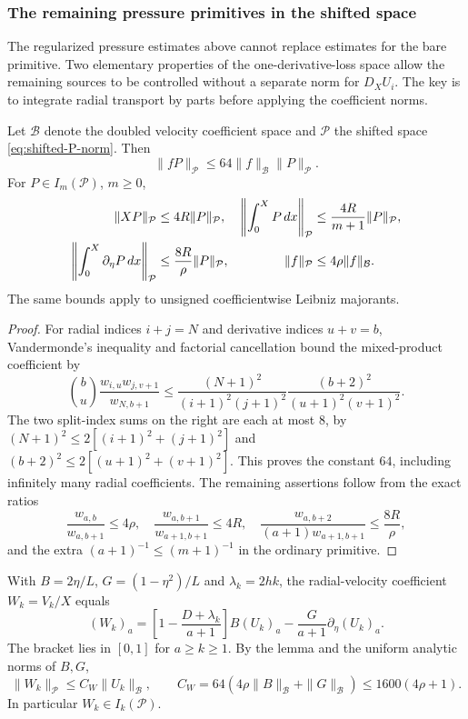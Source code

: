 \subsubsection*{The remaining pressure primitives in the shifted space}
\label{subsec:remaining-bare-pressure}
The regularized pressure estimates above cannot replace estimates for the
bare primitive. Two elementary properties of the one-derivative-loss space
allow the remaining sources to be controlled without a separate norm for
$D_XU_i$. The key is to integrate radial transport by parts before
applying the coefficient norms.

\begin{lemma}
\label{lem:BP-multiplier}
Let $\mathcal B$ denote the doubled velocity coefficient space and
$\mathcal P$ the shifted space \eqref{eq:shifted-P-norm}. Then
\begin{equation}\label{eq:BP-algebra}
 \|fP\|_{\mathcal P}\le64\|f\|_{\mathcal B}\|P\|_{\mathcal P}.
\end{equation}
For $P\in I_m(\mathcal P)$, $m\ge0$,
\begin{align}
 \|XP\|_{\mathcal P}&\le4R\|P\|_{\mathcal P},&
 \left\|\int_0^X P\,dx\right\|_{\mathcal P}
   &\le\frac{4R}{m+1}\|P\|_{\mathcal P},\label{eq:P-radial-ops}\\
 \left\|\int_0^X\partial_\eta P\,dx\right\|_{\mathcal P}
   &\le\frac{8R}{\rho}\|P\|_{\mathcal P},&
 \|f\|_{\mathcal P}&\le4\rho\|f\|_{\mathcal B}.\notag
\end{align}
The same bounds apply to unsigned coefficientwise Leibniz majorants.
\end{lemma}
\begin{proof}
For radial indices $i+j=N$ and derivative indices $u+v=b$,
Vandermonde's inequality and factorial cancellation bound the
mixed-product coefficient by
\[
 \binom bu\frac{w_{i,u}w_{j,v+1}}{w_{N,b+1}}
 \le\frac{(N+1)^2}{(i+1)^2(j+1)^2}
      \frac{(b+2)^2}{(u+1)^2(v+1)^2}.
\]
The two split-index sums on the right are each at most $8$, by
$(N+1)^2\le2[(i+1)^2+(j+1)^2]$ and
$(b+2)^2\le2[(u+1)^2+(v+1)^2]$. This proves the constant $64$,
including infinitely many radial coefficients.
The remaining assertions follow from the exact ratios
\[
 \frac{w_{a,b}}{w_{a,b+1}}\le4\rho,\quad
 \frac{w_{a,b+1}}{w_{a+1,b+1}}\le4R,\quad
 \frac{w_{a,b+2}}{(a+1)w_{a+1,b+1}}\le\frac{8R}{\rho},
\]
and the extra $(a+1)^{-1}\le(m+1)^{-1}$ in the ordinary primitive.
\end{proof}

With $B=2\eta/L$, $G=(1-\eta^2)/L$ and $\lambda_k=2hk$,
the radial-velocity coefficient $W_k=V_k/X$ equals
\[
 (W_k)_a=\left[1-\frac{D+\lambda_k}{a+1}\right]
 B(U_k)_a-\frac G{a+1}\partial_\eta(U_k)_a.
\]
The bracket lies in $[0,1]$ for $a\ge k\ge1$.
By the lemma and the uniform analytic norms of $B,G$,
\begin{equation}\label{eq:CW}
 \|W_k\|_{\mathcal P}\le C_W\|U_k\|_{\mathcal B},\qquad
 C_W=64(4\rho\|B\|_{\mathcal B}+\|G\|_{\mathcal B})
 \le1600(4\rho+1).
\end{equation}
In particular $W_k\in I_k(\mathcal P)$.

